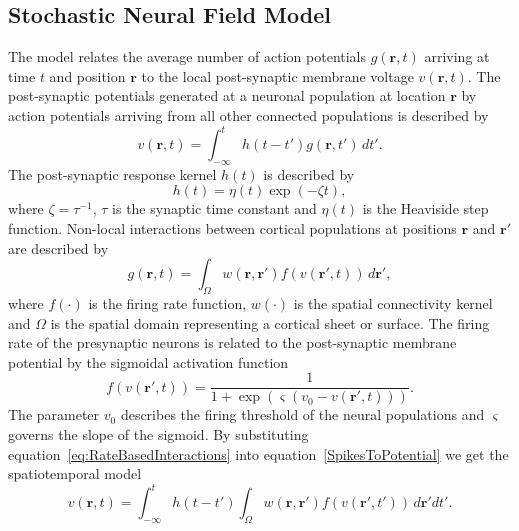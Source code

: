 \documentclass[conference]{IEEEtran}
\begin{document}
\subsection{Stochastic Neural Field Model}
The model relates the average number of action potentials $g(\mathbf{r},t)$ arriving at time $t$ and position $\mathbf{r}$ to the local post-synaptic membrane voltage $v(\mathbf{r},t)$. The post-synaptic potentials generated at a neuronal population at location $\mathbf{r}$ by action potentials arriving from all other connected populations is described by 
\begin{equation}
	\label{SpikesToPotential} v\left( {\mathbf{r},t} \right) = \int_{ - \infty }^t {h\left( {t - t'} \right)g\left( {\mathbf{r},t'} \right) \, dt'}. 
\end{equation}
The post-synaptic response kernel $h(t)$ is described by 
\begin{equation}
	\label{SynapticRespKernel} h(t) = \eta(t)\exp{\left(-\zeta t\right)}, 
\end{equation}
where $\zeta=\tau^{-1}$, $\tau$ is the synaptic time constant and $\eta(t)$ is the Heaviside step function. Non-local interactions between cortical populations at positions $\mathbf{r}$ and $\mathbf{r}'$ are described by 
\begin{equation}
	\label{eq:RateBasedInteractions} g\left( \mathbf{r},t \right) = \int_\Omega {w\left( \mathbf{r},\mathbf{r}' \right)f\left( v\left( \mathbf{r}',t \right) \right)\, d\mathbf{r}'}, 
\end{equation}
where $f(\cdot)$ is the firing rate function, $w(\cdot)$ is the spatial connectivity kernel and $\Omega$ is the spatial domain representing a cortical sheet or surface. The firing rate of the presynaptic neurons is related to the post-synaptic membrane potential by the sigmoidal activation function 
\begin{equation}
	\label{ActivationFunction} f\left( v\left( \mathbf{r}', t \right) \right) = \frac{1}{1 + \exp \left( \varsigma \left( v_0 - v\left(\mathbf{r}',t\right) \right) \right)}. 
\end{equation}
The parameter $v_0$ describes the firing threshold of the neural populations and $\varsigma$ governs the slope of the sigmoid. By substituting equation~\ref{eq:RateBasedInteractions} into equation~\ref{SpikesToPotential} we get the spatiotemporal model 
\begin{equation}
	\label{FullDoubleIntModel} v\left(\mathbf{r},t\right) =
	\int_{-\infty}^t 
	h\left(t - t'\right) \int_\Omega
	w\left(\mathbf{r},\mathbf{r}'\right) 
	f\left( v\left( \mathbf{r}',t' \right)\right)
	\, d\mathbf{r}'dt'.
\end{equation}
\end{document}

